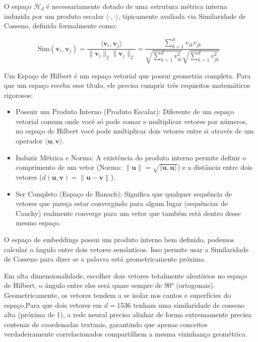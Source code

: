 \documentclass[12pt]{article}
\begin{document}
    O espaço $\mathcal{H}_d$ é necessariamente dotado de uma estrutura métrica interna induzida por um produto escalar $\langle \cdot, \cdot \rangle$, tipicamente avaliada via Similaridade de Cosseno, definida formalmente como:
    
    $$\text{Sim}(\mathbf{v}_i, \mathbf{v}_j) = \frac{\langle \mathbf{v}_i, \mathbf{v}_j \rangle}{\|\mathbf{v}_i\|_2 \|\mathbf{v}_j\|_2} = \frac{\sum_{k=1}^d v_{ik} v_{jk}}{\sqrt{\sum_{k=1}^d v_{ik}^2} \sqrt{\sum_{k=1}^d v_{jk}^2}}$$

    Um Espaço de Hilbert é um espaço vetorial que possui geometria completa. Para que um espaço receba esse título, ele precisa cumprir três requisitos matemáticos rigorosos:

    \begin{itemize}
        \item Possuir um Produto Interno (Produto Escalar): Diferente de um espaço vetorial comum onde você só pode somar e multiplicar vetores por números, no espaço de Hilbert você pode multiplicar dois vetores entre si através de um operador $\langle \mathbf{u}, \mathbf{v} \rangle$.
        \item Induzir Métrica e Norma: A existência do produto interno permite definir o comprimento de um vetor (Norma: $\|\mathbf{u}\| = \sqrt{\langle \mathbf{u}, \mathbf{u} \rangle}$) e a distância entre dois vetores ($d(\mathbf{u}, \mathbf{v}) = \|\mathbf{u} - \mathbf{v}\|$).
        \item Ser Completo (Espaço de Banach): Significa que qualquer sequência de vetores que pareça estar convergindo para algum lugar (sequências de Cauchy) realmente converge para um vetor que também está dentro desse mesmo espaço.
    \end{itemize}
    
    O espaço de embeddings possui um produto interno bem definido, podemos calcular o ângulo entre dois vetores semânticos. Isso permite usar a Similaridade de Cosseno para dizer se a palavra está geometricamente próxima.

    Em alta dimensionalidade, escolher dois vetores totalmente aleatórios no espaço de Hilbert, o ângulo entre eles será quase sempre de 90° (ortogonais). Geometricamente, os vetores tendem a se isolar nos cantos e superfícies do espaço.Para que dois vetores em $d=1536$ tenham uma similaridade de cosseno alta (próxima de 1), a rede neural precisa alinhar de forma extremamente precisa centenas de coordenadas textuais, garantindo que apenas conceitos verdadeiramente correlacionados compartilhem a mesma vizinhança geométrica.
	
\end{document}
